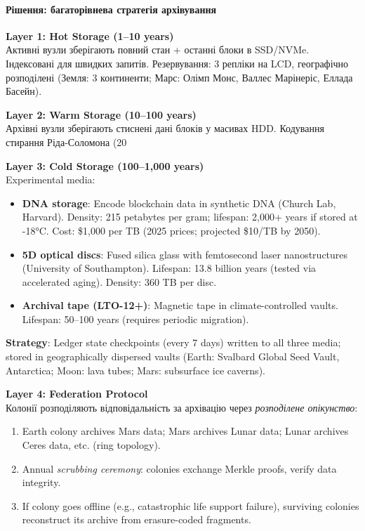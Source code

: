 \documentclass[11pt]{article}
\begin{document}
\paragraph{Рішення: багаторівнева стратегія архівування}

\textbf{Layer 1: Hot Storage (1--10 years)}\\
Активні вузли зберігають повний стан + останні блоки в SSD/NVMe. Індексовані для швидких запитів. Резервування: 3 репліки на LCD, географічно розподілені (Земля: 3 континенти; Марс: Олімп Монс, Валлес Марінеріс, Еллада Басейн).

\textbf{Layer 2: Warm Storage (10--100 years)}\\
Архівні вузли зберігають стиснені дані блоків у масивах HDD. Кодування стирання Ріда-Соломона (20%

\textbf{Layer 3: Cold Storage (100--1,000 years)}\\
Experimental media:
\begin{itemize}[noitemsep]
  \item \textbf{DNA storage}: Encode blockchain data in synthetic DNA (Church Lab, Harvard). Density: 215 petabytes per gram; lifespan: 2,000+ years if stored at -18°C. Cost: \$1,000 per TB (2025 prices; projected \$10/TB by 2050).
  \item \textbf{5D optical discs}: Fused silica glass with femtosecond laser nanostructures (University of Southampton). Lifespan: 13.8 billion years (tested via accelerated aging). Density: 360 TB per disc.
  \item \textbf{Archival tape (LTO-12+)}: Magnetic tape in climate-controlled vaults. Lifespan: 50--100 years (requires periodic migration).
\end{itemize}
\textbf{Strategy}: Ledger state checkpoints (every 7 days) written to all three media; stored in geographically dispersed vaults (Earth: Svalbard Global Seed Vault, Antarctica; Moon: lava tubes; Mars: subsurface ice caverns).

\textbf{Layer 4: Federation Protocol}\\
Колонії розподіляють відповідальність за архівацію через \emph{розподілене опікунство}:
\begin{enumerate}[noitemsep]
  \item Earth colony archives Mars data; Mars archives Lunar data; Lunar archives Ceres data, etc. (ring topology).
  \item Annual \emph{scrubbing ceremony}: colonies exchange Merkle proofs, verify data integrity.
  \item If colony goes offline (e.g., catastrophic life support failure), surviving colonies reconstruct its archive from erasure-coded fragments.
\end{enumerate}
\end{document}
